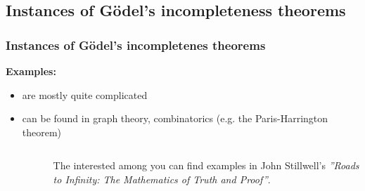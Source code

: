 \subsection{Instances of Gödel's incompleteness theorems}

\begin{frame}
    \frametitle{Instances of Gödel's incompletenes theorems}
    \textbf{Examples:}
    \begin{itemize}
      \item are mostly quite complicated
      \item can be found in graph theory, combinatorics (e.g. the Paris-Harrington theorem)
    \end{itemize}
    
    \begin{columns}
      \begin{column}{.5\textwidth}
        \begin{figure}
        \end{figure}
      \end{column}
      \begin{column}{.5\textwidth}
        The interested among you can find examples in John Stillwell's \emph{''Roads to Infinity: The Mathematics of Truth and Proof''}.
      \end{column}
    \end{columns}


\end{frame}